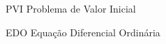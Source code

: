 \documentclass[
	12pt,				%
    oneside,			%
	a4paper,			%
	english,			%
	french,				%
	spanish,			%
	brazil,				%
	]{abntex2}
\author{João Felipe Gobeti Calenzani
{\footnotesize\ttfamily}}
\begin{document}
\frenchspacing 


\imprimircapa

\imprimirfolhaderosto*




    


\listoffigures* %
\cleardoublepage




\begin{siglas}
  \item[PVI] Problema de Valor Inicial
  \item[EDO] Equação Diferencial Ordinária 
\end{siglas}




\end{document}
